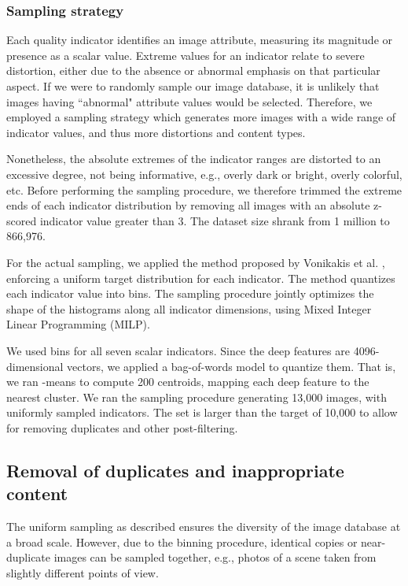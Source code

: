 \documentclass{article}
\begin{document}
\subsubsection{Sampling strategy}
Each quality indicator identifies an image attribute, measuring its magnitude or presence as a scalar value. Extreme values for an indicator relate to severe distortion, either due to the absence or abnormal emphasis on that particular aspect. If we were to randomly sample our image database, it is unlikely that images having ``abnormal" attribute values would be selected. Therefore, we employed a sampling strategy which generates more images with a wide range of indicator values, and thus more distortions and content types.

Nonetheless, the absolute extremes of the indicator ranges are distorted to an excessive degree, not being informative, e.g., overly dark or bright, overly colorful, etc. Before performing the sampling procedure, we therefore trimmed the extreme ends of each indicator distribution by removing all images with an absolute z-scored indicator value greater than 3. The dataset size shrank from 1 million to 866,976.

For the actual sampling, we applied the method proposed by Vonikakis et al. \cite{vonikakis2016shaping}, enforcing a uniform target distribution for each indicator. The method quantizes each indicator value into  bins. The sampling procedure jointly optimizes the shape of the histograms along all indicator dimensions, using Mixed Integer Linear Programming (MILP).

We used  bins for all seven scalar indicators. Since the deep features are 4096-dimensional vectors, we applied a bag-of-words model to quantize them. That is, we ran -means to compute 200 centroids, mapping each deep feature to the nearest cluster. We ran the sampling procedure generating 13,000 images, with uniformly sampled indicators. The set is larger than the target of 10,000 to allow for removing duplicates and other post-filtering. 


\subsection{Removal of duplicates and inappropriate content}

The uniform sampling as described ensures the diversity of the image database at a broad scale. However, due to the binning procedure, identical copies or near-duplicate images can be sampled together, e.g.,  photos of a scene taken from slightly different points of view.
\end{document}
